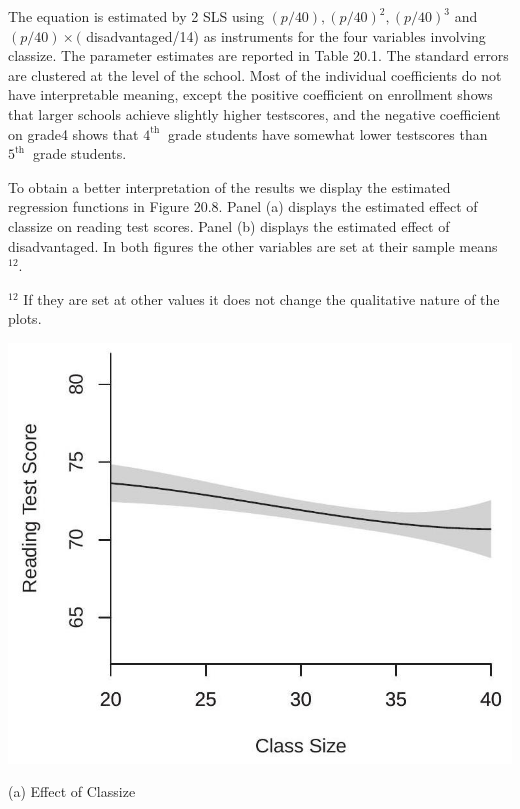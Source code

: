 \documentclass[10pt]{article}
\begin{document}
The equation is estimated by 2 SLS using $(p / 40),(p / 40)^{2},(p / 40)^{3}$ and $(p / 40) \times($ disadvantaged/14) as instruments for the four variables involving classize. The parameter estimates are reported in Table 20.1. The standard errors are clustered at the level of the school. Most of the individual coefficients do not have interpretable meaning, except the positive coefficient on enrollment shows that larger schools achieve slightly higher testscores, and the negative coefficient on grade4 shows that $4^{\text {th }}$ grade students have somewhat lower testscores than $5^{\text {th }}$ grade students.

To obtain a better interpretation of the results we display the estimated regression functions in Figure 20.8. Panel (a) displays the estimated effect of classize on reading test scores. Panel (b) displays the estimated effect of disadvantaged. In both figures the other variables are set at their sample means ${ }^{12}$.

${ }^{12}$ If they are set at other values it does not change the qualitative nature of the plots.

\includegraphics[max width=\textwidth]{2022_10_23_2b38d6d54e7725c196e7g-31}

(a) Effect of Classize
\end{document}
